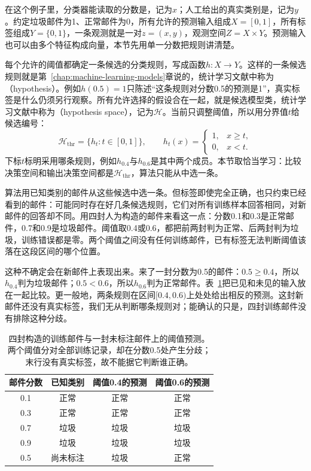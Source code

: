 在这个例子里，分类器能读取的分数是，记为$x$；人工给出的真实类别是，记为$y$。约定垃圾邮件为1、正常邮件为0，所有允许的预测输入组成$X=[0,1]$，所有标签组成$Y=\{0,1\}$，一条观测就是一对$z=(x,y)$，观测空间$Z=X\times Y$。预测输入也可以由多个特征构成向量，本节先用单一分数把规则讲清楚。

每个允许的阈值都确定一条候选的分类规则，写成函数$h:X\to Y$。这样的一条候选规则就是第~\ref{chap:machine-learning-models}章说的，统计学习文献中称为（hypothesis）。例如$h(0.5)=1$只陈述“这条规则对分数0.5的预测是1”，真实标签是什么仍须另行观察。所有允许选择的假设合在一起，就是候选模型类，统计学习文献中称为（hypothesis space），记为$\mathcal H$。当前只调整阈值，所以用分界值$t$给候选编号：
\begin{equation}
 \mathcal H_{\mathrm{thr}}=\{h_t:t\in[0,1]\},\qquad
 h_t(x)=\begin{cases}
  1,&x\geq t,\\
  0,&x<t.
 \end{cases}
 \label{eq:threshold-hypothesis-class}
\end{equation}
下标$t$标明采用哪条规则，例如$h_{0.4}$与$h_{0.6}$是其中两个成员。本节取恰当学习：比较决策空间和输出决策空间都是$\mathcal H_{\mathrm{thr}}$，算法只能从中选一条。

算法用已知类别的邮件从这些候选中选一条。但标签即使完全正确，也只约束已经看到的邮件：可能同时存在好几条候选规则，它们对所有训练样本回答相同，对新邮件的回答却不同。用四封人为构造的邮件来看这一点：分数0.1和0.3是正常邮件，0.7和0.9是垃圾邮件。阈值取0.4或0.6，都把前两封判为正常、后两封判为垃圾，训练错误都是零。两个阈值之间没有任何训练邮件，已有标签无法判断阈值该落在这段区间的哪个位置。

这种不确定会在新邮件上表现出来。来了一封分数为0.5的邮件：$0.5\geq0.4$，所以$h_{0.4}$判为垃圾邮件；$0.5<0.6$，所以$h_{0.6}$判为正常邮件。表~\ref{tab:threshold-email-decisions}把已见和未见的输入放在一起比较。更一般地，两条规则在区间$[0.4,0.6)$上处处给出相反的预测。这封新邮件还没有真实标签，我们无从判断哪条规则对；能确认的只是，四封训练邮件没有排除这种分歧。

\begin{table}[htbp]
 \centering
 \begin{tabular}{cccc}
  \toprule
  邮件分数 & 已知类别 & 阈值0.4的预测 & 阈值0.6的预测\\
  \midrule
  0.1 & 正常 & 正常 & 正常\\
  0.3 & 正常 & 正常 & 正常\\
  0.7 & 垃圾 & 垃圾 & 垃圾\\
  0.9 & 垃圾 & 垃圾 & 垃圾\\
  \midrule
  0.5 & 尚未标注 & 垃圾 & 正常\\
  \bottomrule
 \end{tabular}
 \caption{四封构造的训练邮件与一封未标注邮件上的阈值预测。两个阈值分对全部训练记录，却在分数0.5处产生分歧；末行没有真实标签，故不能据它判断谁正确。}
 \label{tab:threshold-email-decisions}
\end{table}


